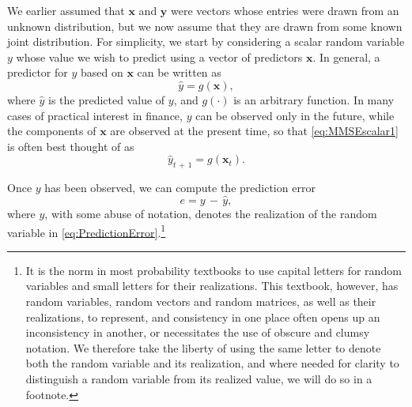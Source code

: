 \documentclass[graybox,envcountchap,sectrefs]{svmono}\usepackage[]{graphicx}\usepackage[]{xcolor}
\begin{document}
\begin{appendices}
We earlier assumed that $\mathrm{\mathbf{x}}$ and $\mathrm{\mathbf{y}}$
were vectors whose entries were drawn from an unknown distribution,
but we now assume that they are drawn from some known joint distribution.
For simplicity, we start by considering a scalar random variable $y$
whose value we wish to predict using a vector of predictors $\mathrm{\mathbf{x}}$.
In general, a predictor for $y$ based on $\mathrm{\mathbf{x}}$ can
be written as
\begin{equation}
\hat{y}=g\left(\mathrm{\mathbf{x}}\right),\label{eq:MMSEscalar1}
\end{equation}
where $\hat{y}$ is the predicted value of $y$, and $g\left(\cdotp\right)$
is an arbitrary function. In many cases of practical interest in finance,
$y$ can be observed only in the future, while the components of $\mathrm{\mathbf{x}}$
are observed at the present time, so that \eqref{eq:MMSEscalar1}
is often best thought of as
\begin{equation}
\hat{y}_{t\,+\,1}=g\left(\mathrm{\mathbf{x}}_{t}\right).\label{eq:MMSEscalar2}
\end{equation}

Once $y$ has been observed, we can compute the prediction error
\begin{equation}
e=y\,-\,\hat{y},\label{eq:PredictionError}
\end{equation}
where $y$, with some abuse of notation, denotes the realization of
the random variable in \eqref{eq:PredictionError}.\footnote{It is the norm in most probability textbooks to use capital letters
for random variables and small letters for their realizations. This
textbook, however, has random variables, random vectors and random
matrices, as well as their realizations, to represent, and consistency
in one place often opens up an inconsistency in another, or necessitates
the use of obscure and clumsy notation. We therefore take the liberty
of using the same letter to denote both the random variable and its
realization, and where needed for clarity to distinguish a random
variable from its realized value, we will do so in a footnote.

}
\end{appendices}
\end{document}
